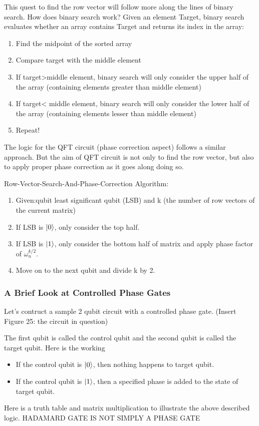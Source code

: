 \documentclass{article}
\newcommand{\om}{\omega_n}
\begin{document}
    This quest to find the row vector will follow more along the lines of
    binary search. How does binary search work? Given an element Target,
    binary search evaluates whether an array contains Target and returns
    its index in the array:
    \begin{enumerate}
      \item Find the midpoint of the sorted array
      \item Compare target with the middle element
      \item If target>middle element, binary search will only consider
      the upper half of the array (containing elements greater than
      middle element)
      \item If target< middle element, binary search will only consider
      the lower half of the array (containing elements lesser than
      middle element)
      \item Repeat!
    \end{enumerate}
    The logic for the QFT circuit (phase correction aspect) follows a similar approach. But the aim of
    QFT circuit is not only to find the row vector, but also to apply proper
    phase correction as it goes along doing so.

    Row-Vector-Search-And-Phase-Correction Algorithm:
    \begin{enumerate}
      \item Given:qubit least significant qubit (LSB) and k (the number of row
      vectors of the current matrix)
      \item If LSB is \(\ket{0}\), only consider the top half.
      \item If LSB is \(\ket{1}\), only consider the bottom half of matrix and
      apply phase factor of \(\om^{k/2}\).
      \item Move on to the next qubit and divide k by 2.
    \end{enumerate}

    \subsubsection{A Brief Look at Controlled Phase Gates}
    Let's contruct a sample 2 qubit circuit with a controlled phase gate.
    (Insert Figure 25: the circuit in question)

    The first qubit is called the control qubit and the second qubit is
    called the target qubit. Here is the working
    \begin{itemize}
      \item If the control qubit is \(\ket{0}\), then nothing happens to
      target qubit.
      \item If the control qubit is \(\ket{1}\), then a specified phase
      is added to the state of target qubit.
    \end{itemize}
    Here is a truth table and matrix multiplication to illustrate the above
    described logic.
    HADAMARD GATE IS NOT SIMPLY A PHASE GATE
\end{document}
